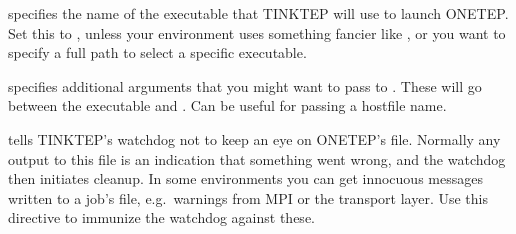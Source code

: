 \documentclass[letterpaper,10pt,english]{sphinxmanual}
\begin{document}
  \textendash{} specifies the
name of the  executable that TINKTEP will use to launch
ONETEP. Set this to , unless your environment uses something
fancier like , or you want to specify a full path to select a
specific  executable.

  \textendash{} specifies
additional arguments that you might want to pass to . These
will go between the  executable and .
Can be useful for passing a hostfile name.

  \textendash{}
tells TINKTEP’s watchdog not to keep an eye on ONETEP’s 
file. Normally any output to this file is an indication that something
went wrong, and the watchdog then initiates cleanup. In some
environments you can get innocuous messages written to a job’s 
file, e.g. warnings from MPI or the transport layer. Use this directive
to immunize the watchdog against these.
\end{document}
